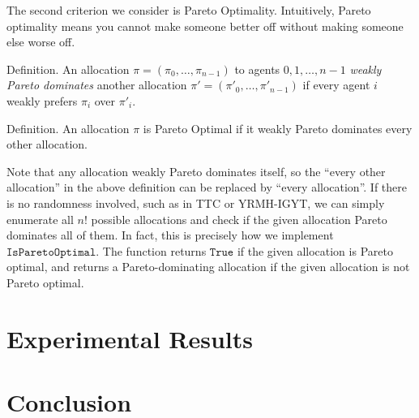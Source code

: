 \documentclass[12pt]{article}
\begin{document}
The second criterion we consider is Pareto Optimality. Intuitively, Pareto optimality means you cannot make someone better off without making someone else worse off. 

Definition. An allocation $\pi = (\pi_0,\dots,\pi_{n-1})$ to agents $0,1,\dots,n-1$ \textit{weakly Pareto dominates} another allocation $\pi' = (\pi'_0,\dots,\pi'_{n-1})$ if every agent $i$ weakly prefers $\pi_i$ over $\pi'_i$.

Definition. An allocation $\pi$ is Pareto Optimal if it  weakly Pareto dominates every other allocation.

Note that any allocation weakly Pareto dominates itself, so the ``every other allocation'' in the above definition can be replaced by ``every allocation''. If there is no randomness involved, such as in TTC or YRMH-IGYT, we can simply enumerate all $n!$ possible allocations and check if the given allocation Pareto dominates all of them. In fact, this is precisely how we implement $\texttt{IsParetoOptimal}$. The function returns $\texttt{True}$ if the given allocation is Pareto optimal, and returns a Pareto-dominating allocation if the given allocation is not Pareto optimal. 



\section*{Experimental Results}
\section*{Conclusion}
\end{document}
